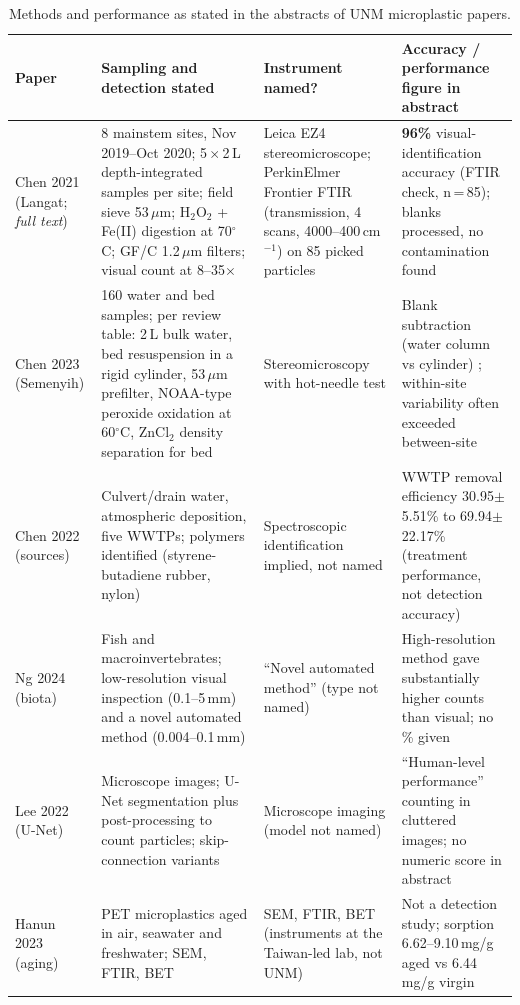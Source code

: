 \documentclass[11pt,a4paper]{article}
\newcommand{\um}{\,\ensuremath{\mu}m}
\begin{document}
\begin{table}[H]\centering\scriptsize
\begin{tabularx}{\textwidth}{@{}p{1.6cm}XXX@{}}
\toprule Paper & Sampling and detection stated & Instrument named? & Accuracy / performance figure in abstract \\\midrule
Chen 2021 (Langat; \emph{full text}) \cite{chen21a} & 8 mainstem sites, Nov 2019--Oct 2020; 5\,$\times$\,2\,L depth-integrated samples per site; field sieve 53\um; H$_2$O$_2$ + Fe(II) digestion at 70$^\circ$C; GF/C 1.2\um{} filters; visual count at 8--35$\times$ & Leica EZ4 stereomicroscope; PerkinElmer Frontier FTIR (transmission, 4 scans, 4000--400\,cm$^{-1}$) on 85 picked particles & \textbf{96\%} visual-identification accuracy (FTIR check, n\,=\,85); blanks processed, no contamination found \\
Chen 2023 (Semenyih) \cite{chen23} & 160 water and bed samples; per review table: 2\,L bulk water, bed resuspension in a rigid cylinder, 53\um{} prefilter, NOAA-type peroxide oxidation at 60$^\circ$C, ZnCl$_2$ density separation for bed \cite{bouida26} & Stereomicroscopy with hot-needle test \cite{bouida26} & Blank subtraction (water column vs cylinder) \cite{bouida26}; within-site variability often exceeded between-site \\
Chen 2022 (sources) \cite{chen22} & Culvert/drain water, atmospheric deposition, five WWTPs; polymers identified (styrene-butadiene rubber, nylon) & Spectroscopic identification implied, not named & WWTP removal efficiency 30.95$\pm$5.51\% to 69.94$\pm$22.17\% (treatment performance, not detection accuracy) \\
Ng 2024 (biota) \cite{ng24} & Fish and macroinvertebrates; low-resolution visual inspection (0.1--5\,mm) and a novel automated method (0.004--0.1\,mm) & ``Novel automated method'' (type not named) & High-resolution method gave substantially higher counts than visual; no \% given \\
Lee 2022 (U-Net) \cite{lee22} & Microscope images; U-Net segmentation plus post-processing to count particles; skip-connection variants & Microscope imaging (model not named) & ``Human-level performance'' counting in cluttered images; no numeric score in abstract \\
Hanun 2023 (aging) \cite{hanun23} & PET microplastics aged in air, seawater and freshwater; SEM, FTIR, BET & SEM, FTIR, BET (instruments at the Taiwan-led lab, not UNM) & Not a detection study; sorption 6.62--9.10\,mg/g aged vs 6.44\,mg/g virgin \\
\bottomrule\end{tabularx}
\caption{Methods and performance as stated in the abstracts of UNM microplastic papers.}
\end{table}
\end{document}
